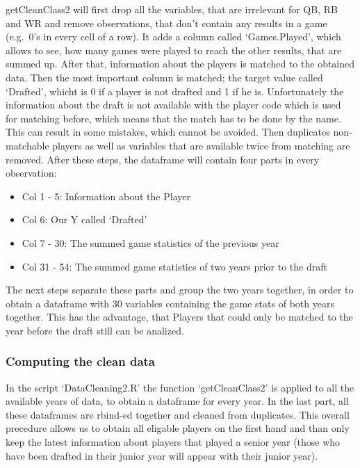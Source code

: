 \documentclass[]{article}
\providecommand{\tightlist}{%
  \setlength{\itemsep}{0pt}\setlength{\parskip}{0pt}}
\begin{document}
getCleanClass2 will first drop all the variables, that are irrelevant
for QB, RB and WR and remove observations, that don't contain any
results in a game (e.g.~0's in every cell of a row). It adds a column
called `Games.Played', which allows to see, how many games were played
to reach the other results, that are summed up. After that, information
about the players is matched to the obtained data. Then the most
important column is matched; the target value called `Drafted', whicht
is 0 if a player is not drafted and 1 if he is. Unfortunately the
information about the draft is not available with the player code which
is used for matching before, which means that the match has to be done
by the name. This can result in some mistakes, which cannot be avoided.
Then duplicates non-matchable players as well as variables that are
available twice from matching are removed. After these steps, the
dataframe will contain four parts in every observation:

\begin{itemize}
\tightlist
\item
  Col 1 - 5: Information about the Player
\item
  Col 6: Our Y called `Drafted'
\item
  Col 7 - 30: The summed game statistics of the previous year
\item
  Col 31 - 54: The summed game statistics of two years prior to the
  draft
\end{itemize}

The next steps separate these parts and group the two years together, in
order to obtain a dataframe with 30 variables containing the game stats
of both years together. This has the advantage, that Players that could
only be matched to the year before the draft still can be analized.

\hypertarget{computing-the-clean-data}{%
\subsubsection{Computing the clean
data}\label{computing-the-clean-data}}

In the script `DataCleaning2.R' the function `getCleanClass2' is applied
to all the available years of data, to obtain a dataframe for every
year. In the last part, all these dataframes are rbind-ed together and
cleaned from duplicates. This overall precedure allows us to obtain all
eligable players on the first hand and than only keep the latest
information about players that played a senior year (those who have been
drafted in their junior year will appear with their junior year).
\end{document}
